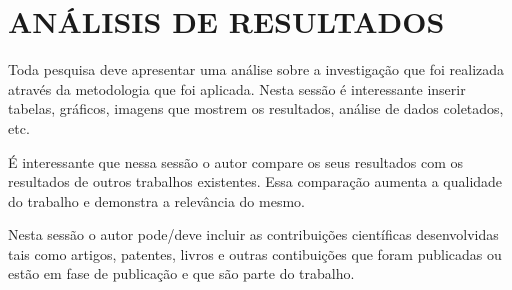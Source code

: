 \section{ANÁLISIS DE RESULTADOS}
Toda pesquisa deve apresentar uma análise sobre a investigação que foi realizada através da metodologia que foi aplicada. Nesta sessão é interessante inserir tabelas, gráficos, imagens que mostrem os resultados, análise de dados coletados, etc.

É interessante que nessa sessão o autor compare os seus resultados com os resultados de outros trabalhos existentes. Essa comparação aumenta a qualidade do trabalho e demonstra a relevância do mesmo. 

Nesta sessão o autor pode/deve incluir as contribuições científicas desenvolvidas tais como artigos, patentes, livros e outras contibuições que foram publicadas ou estão em fase de publicação e que são parte do trabalho.